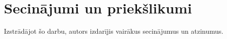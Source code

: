 \section*{Secinājumi un priekšlikumi}%
Izstrādājot šo darbu, autors izdarījis vairākus secinājumus un atzinumus.
\TODO
